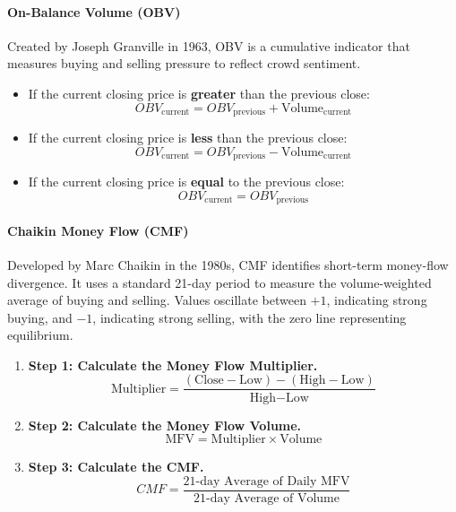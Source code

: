 \documentclass[12pt,openany]{book}
\begin{document}
\paragraph{On-Balance Volume (OBV)}
Created by Joseph Granville in 1963, OBV is a cumulative indicator that measures buying and selling pressure to reflect crowd sentiment.

\begin{itemize}[leftmargin=*]
    \item If the current closing price is \textbf{greater} than the previous close:
    \begin{equation*}
        OBV_{\text{current}} = OBV_{\text{previous}} + \text{Volume}_{\text{current}}
    \end{equation*}

    \item If the current closing price is \textbf{less} than the previous close:
    \begin{equation*}
        OBV_{\text{current}} = OBV_{\text{previous}} - \text{Volume}_{\text{current}}
    \end{equation*}

    \item If the current closing price is \textbf{equal} to the previous close:
    \begin{equation*}
        OBV_{\text{current}} = OBV_{\text{previous}}
    \end{equation*}
\end{itemize}

\paragraph{Chaikin Money Flow (CMF)}
Developed by Marc Chaikin in the 1980s, CMF identifies short-term money-flow divergence. It uses a standard 21-day period to measure the volume-weighted average of buying and selling. Values oscillate between $+1$, indicating strong buying, and $-1$, indicating strong selling, with the zero line representing equilibrium.

\begin{enumerate}[leftmargin=*]
    \item \textbf{Step 1: Calculate the Money Flow Multiplier.}
    \begin{equation*}
        \text{Multiplier} = \frac{(\text{Close} - \text{Low}) - (\text{High} - \text{Low})}{\text{High} - \text{Low}}
    \end{equation*}

    \item \textbf{Step 2: Calculate the Money Flow Volume.}
    \begin{equation*}
        \text{MFV} = \text{Multiplier} \times \text{Volume}
    \end{equation*}

    \item \textbf{Step 3: Calculate the CMF.}
    \begin{equation*}
        CMF = \frac{\text{21-day Average of Daily MFV}}{\text{21-day Average of Volume}}
    \end{equation*}
\end{enumerate}
\end{document}
